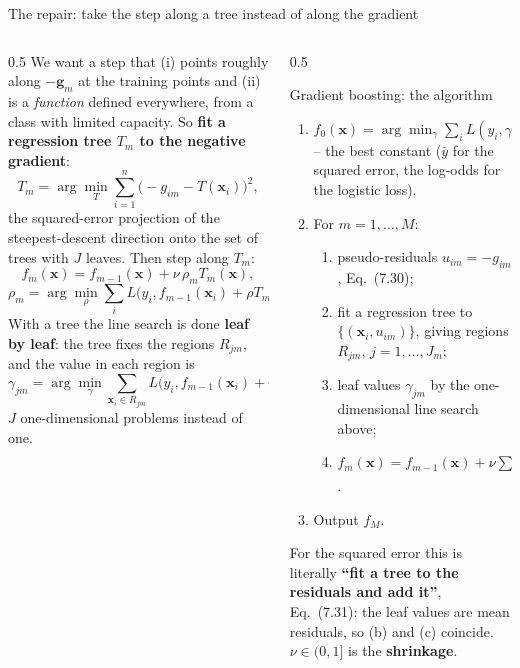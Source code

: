 \documentclass[10pt,aspectratio=169]{beamer}
\begin{document}
\begin{frame}{The repair: take the step along a tree instead of along the gradient}
\begin{columns}[T]
\begin{column}{0.5\textwidth}
\footnotesize
We want a step that (i) points roughly along $-\bm{g}_m$ at the training
points and (ii) is a \emph{function} defined everywhere, from a class with
limited capacity.  So \textbf{fit a regression tree $T_m$ to the negative
gradient}:
\[
T_m=\arg\min_T\sum_{i=1}^n\big(-g_{im}-T(\bm{x}_i)\big)^2 ,
\]
the squared-error projection of the steepest-descent direction onto the
set of trees with $J$ leaves.  Then step along $T_m$:
\[
f_m(\bm{x})=f_{m-1}(\bm{x})+\nu\,\rho_m T_m(\bm{x}),
\]
\[
\rho_m=\arg\min_\rho\sum_iL\big(y_i,f_{m-1}(\bm{x}_i)+\rho T_m(\bm{x}_i)\big).
\]
With a tree the line search is done \textbf{leaf by leaf}: the tree fixes
the regions $R_{jm}$, and the value in each region is
\[
\gamma_{jm}=\arg\min_\gamma\sum_{\bm{x}_i\in R_{jm}}L\big(y_i,f_{m-1}(\bm{x}_i)+\gamma\big),
\]
$J$ one-dimensional problems instead of one.
\end{column}
\begin{column}{0.5\textwidth}
\begin{block}{Gradient boosting: the algorithm}
\footnotesize
\begin{enumerate}
  \item $f_0(\bm{x})=\arg\min_\gamma\sum_iL(y_i,\gamma)$ -- the best
    constant ($\bar y$ for the squared error, the log-odds for the logistic
    loss).
  \item For $m=1,\dots,M$:
  \begin{enumerate}
    \item[(a)] pseudo-residuals $u_{im}=-g_{im}$, Eq.\ (7.30);
    \item[(b)] fit a regression tree to $\{(\bm{x}_i,u_{im})\}$, giving
      regions $R_{jm}$, $j=1,\dots,J_m$;
    \item[(c)] leaf values $\gamma_{jm}$ by the one-dimensional line search
      above;
    \item[(d)] $f_m(\bm{x})=f_{m-1}(\bm{x})+\nu\sum_j\gamma_{jm}I(\bm{x}\in R_{jm})$.
  \end{enumerate}
  \item Output $f_M$.
\end{enumerate}
\end{block}
\footnotesize
For the squared error this is literally \textbf{``fit a tree to the
residuals and add it''}, Eq.\ (7.31): the leaf values are mean residuals,
so (b) and (c) coincide.  $\nu\in(0,1]$ is the \textbf{shrinkage}.
\end{column}
\end{columns}
\end{frame}
\end{document}
